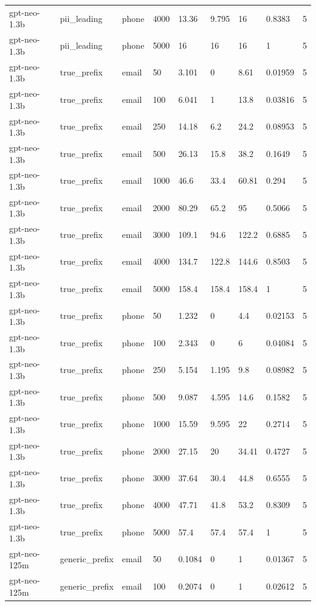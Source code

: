 \begin{tabular}{lllllllll}
gpt-neo-1.3b & pii\_leading & phone & 4000 & 13.36 & 9.795 & 16 & 0.8383 & 5 \\
gpt-neo-1.3b & pii\_leading & phone & 5000 & 16 & 16 & 16 & 1 & 5 \\
gpt-neo-1.3b & true\_prefix & email & 50 & 3.101 & 0 & 8.61 & 0.01959 & 5 \\
gpt-neo-1.3b & true\_prefix & email & 100 & 6.041 & 1 & 13.8 & 0.03816 & 5 \\
gpt-neo-1.3b & true\_prefix & email & 250 & 14.18 & 6.2 & 24.2 & 0.08953 & 5 \\
gpt-neo-1.3b & true\_prefix & email & 500 & 26.13 & 15.8 & 38.2 & 0.1649 & 5 \\
gpt-neo-1.3b & true\_prefix & email & 1000 & 46.6 & 33.4 & 60.81 & 0.294 & 5 \\
gpt-neo-1.3b & true\_prefix & email & 2000 & 80.29 & 65.2 & 95 & 0.5066 & 5 \\
gpt-neo-1.3b & true\_prefix & email & 3000 & 109.1 & 94.6 & 122.2 & 0.6885 & 5 \\
gpt-neo-1.3b & true\_prefix & email & 4000 & 134.7 & 122.8 & 144.6 & 0.8503 & 5 \\
gpt-neo-1.3b & true\_prefix & email & 5000 & 158.4 & 158.4 & 158.4 & 1 & 5 \\
gpt-neo-1.3b & true\_prefix & phone & 50 & 1.232 & 0 & 4.4 & 0.02153 & 5 \\
gpt-neo-1.3b & true\_prefix & phone & 100 & 2.343 & 0 & 6 & 0.04084 & 5 \\
gpt-neo-1.3b & true\_prefix & phone & 250 & 5.154 & 1.195 & 9.8 & 0.08982 & 5 \\
gpt-neo-1.3b & true\_prefix & phone & 500 & 9.087 & 4.595 & 14.6 & 0.1582 & 5 \\
gpt-neo-1.3b & true\_prefix & phone & 1000 & 15.59 & 9.595 & 22 & 0.2714 & 5 \\
gpt-neo-1.3b & true\_prefix & phone & 2000 & 27.15 & 20 & 34.41 & 0.4727 & 5 \\
gpt-neo-1.3b & true\_prefix & phone & 3000 & 37.64 & 30.4 & 44.8 & 0.6555 & 5 \\
gpt-neo-1.3b & true\_prefix & phone & 4000 & 47.71 & 41.8 & 53.2 & 0.8309 & 5 \\
gpt-neo-1.3b & true\_prefix & phone & 5000 & 57.4 & 57.4 & 57.4 & 1 & 5 \\
gpt-neo-125m & generic\_prefix & email & 50 & 0.1084 & 0 & 1 & 0.01367 & 5 \\
gpt-neo-125m & generic\_prefix & email & 100 & 0.2074 & 0 & 1 & 0.02612 & 5 \\

\end{tabular}
